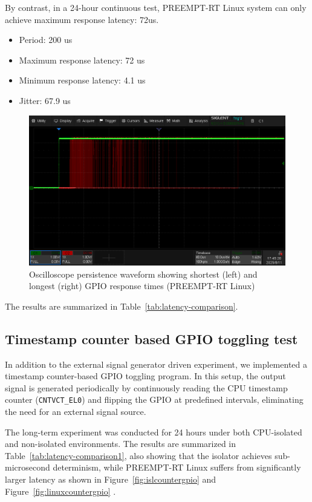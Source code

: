 \documentclass[letterpaper]{article}
\begin{document}
By contrast, in a 24-hour continuous test,  PREEMPT-RT Linux system can only achieve maximum response latency:
72us.
\begin{itemize}
    \item Period: 200 us
    \item Maximum response latency: 72  us
    \item Minimum response latency: 4.1 us
    \item Jitter: 67.9 us
\end{itemize}

\begin{figure}[h]
  \centering
  \includegraphics[width=0.8\linewidth]{figures/linuxintgpio.png}
  \caption{Oscilloscope persistence waveform showing shortest (left) and longest (right) GPIO response times (PREEMPT-RT Linux)}
  \label{fig:linuxintgpio}
\end{figure}

The results are summarized in Table~\ref{tab:latency-comparison}.

\subsection {Timestamp counter based GPIO toggling test} 
In addition to the external signal generator driven experiment, we implemented a timestamp counter-based GPIO toggling program. In this setup, the output signal is generated periodically by continuously reading the CPU timestamp counter (\texttt{CNTVCT\_EL0}) and flipping the GPIO at predefined intervals, eliminating the need for an external signal source.

The long-term experiment was conducted for 24 hours under both CPU-isolated and non-isolated environments. The results are summarized in Table~\ref{tab:latency-comparison1}, also showing that the isolator achieves sub-microsecond determinism, while PREEMPT-RT Linux suffers from significantly larger latency
as shown in Figure~\ref{fig:islcountergpio} and Figure~\ref{fig:linuxcountergpio} .
\end{document}
